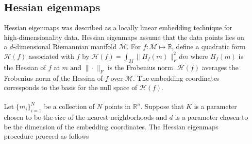 \subsection{Hessian eigenmaps}
\label{sec:hessian-eigenmaps}
Hessian eigenmaps \citet{donoho03:_hesian} was described as a locally
linear embedding technique for high-dimensionality data. Hessian
eigenmaps assume that the data points lies on a $d$-dimensional
Riemannian manifold $\mathcal{M}$. For $f \colon \mathcal{M} \mapsto
\mathbb{R}$, define a quadratic form $\mathcal{H}(f)$ associated with
$f$ by $\mathcal{H}(f) = \int_{M}{ \| H_f(m) \|_{F}^{2} dm }$ where
$H_f(m)$ is the Hessian of $f$ at $m$ and $\| \cdot \|_F$ is the
Frobenius norm. $\mathcal{H}(f)$ averages the Frobenius norm of the
Hessian of $f$ over $\mathcal{M}$. The embedding coordinates
corresponds to the basis for the null space of $\mathcal{H}(f)$. \\ \\
\noindent
Let $\{m_i\}_{i=1}^{N}$ be a collection of $N$ points in
$\mathbb{R}^{n}$. Suppose that $K$ is a parameter chosen to be the
size of the nearest neighborhoods and $d$ is a parameter chosen to be
the dimension of the embedding coordinates. The Hessian eigenmaps
procedure proceed as follows \citet{donoho03:_hesian}
